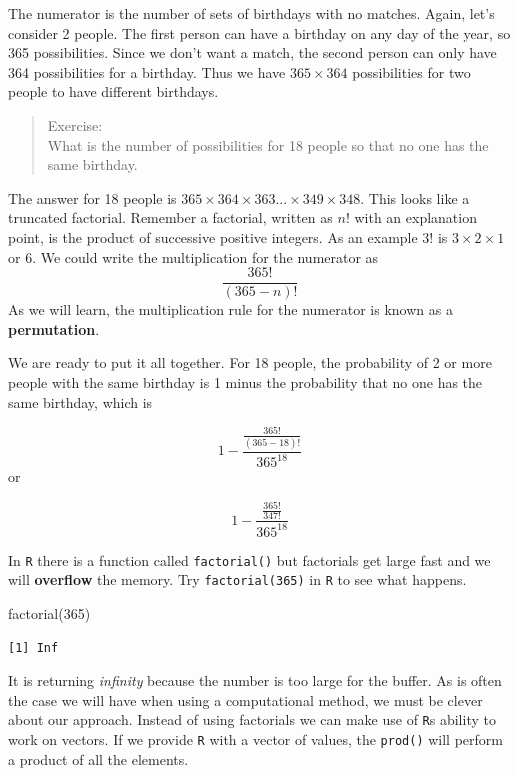 \documentclass[
  letterpaper,
  DIV=11,
  numbers=noendperiod]{scrreprt}
\newenvironment{Shaded}{\begin{snugshade}}{\end{snugshade}}
\newcommand{\DecValTok}[1]{\textcolor[rgb]{0.68,0.00,0.00}{#1}}
\newcommand{\FunctionTok}[1]{\textcolor[rgb]{0.28,0.35,0.67}{#1}}
\newcommand{\NormalTok}[1]{\textcolor[rgb]{0.00,0.23,0.31}{#1}}
\begin{document}
The numerator is the number of sets of birthdays with no matches. Again,
let's consider 2 people. The first person can have a birthday on any day
of the year, so 365 possibilities. Since we don't want a match, the
second person can only have 364 possibilities for a birthday. Thus we
have \(365 \times 364\) possibilities for two people to have different
birthdays.

\begin{quote}
Exercise:\\
What is the number of possibilities for 18 people so that no one has the
same birthday.
\end{quote}

The answer for 18 people is
\(365 \times 364 \times 363 ... \times 349 \times 348\). This looks like
a truncated factorial. Remember a factorial, written as \(n!\) with an
explanation point, is the product of successive positive integers. As an
example \(3!\) is \(3 \times 2 \times 1\) or 6. We could write the
multiplication for the numerator as \[\frac{365!}{(365-n)!}\] As we will
learn, the multiplication rule for the numerator is known as a
\textbf{permutation}.

We are ready to put it all together. For 18 people, the probability of 2
or more people with the same birthday is 1 minus the probability that no
one has the same birthday, which is

\[1 - \frac{\frac{365!}{(365-18)!}}{365^{18}}\] or

\[1 - \frac{\frac{365!}{347!}}{365^{18}}\]

In \texttt{R} there is a function called \texttt{factorial()} but
factorials get large fast and we will \textbf{overflow} the memory. Try
\texttt{factorial(365)} in \texttt{R} to see what happens.

\begin{Shaded}
\begin{Highlighting}[]
\FunctionTok{factorial}\NormalTok{(}\DecValTok{365}\NormalTok{)}
\end{Highlighting}
\end{Shaded}

\begin{verbatim}
[1] Inf
\end{verbatim}

It is returning \emph{infinity} because the number is too large for the
buffer. As is often the case we will have when using a computational
method, we must be clever about our approach. Instead of using
factorials we can make use of \texttt{R}s ability to work on vectors. If
we provide \texttt{R} with a vector of values, the \texttt{prod()} will
perform a product of all the elements.
\end{document}
